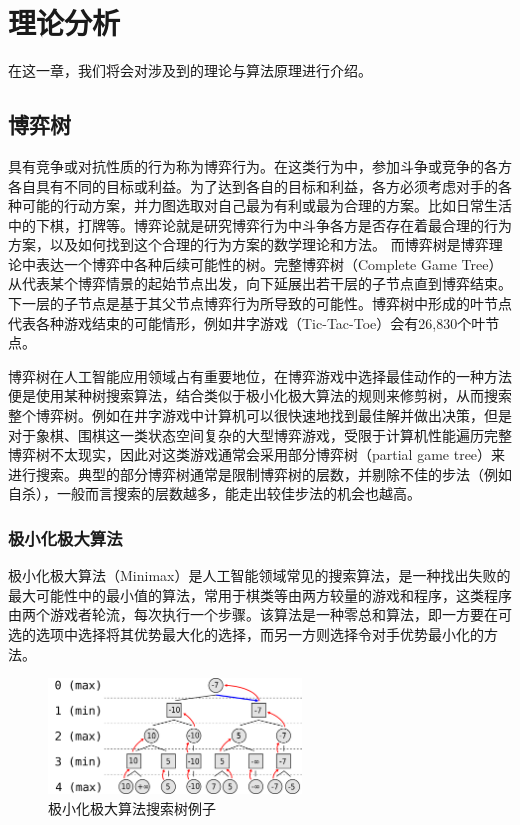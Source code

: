 \chapter{理论分析}
\label{chap:theory}
在这一章，我们将会对涉及到的理论与算法原理进行介绍。
\section{博弈树}
具有竞争或对抗性质的行为称为博弈行为。在这类行为中，参加斗争或竞争的各方各自具有不同的目标或利益。为了达到各自的目标和利益，各方必须考虑对手的各种可能的行动方案，并力图选取对自己最为有利或最为合理的方案。比如日常生活中的下棋，打牌等。博弈论就是研究博弈行为中斗争各方是否存在着最合理的行为方案，以及如何找到这个合理的行为方案的数学理论和方法\cite{gt}。
而博弈树是博弈理论中表达一个博弈中各种后续可能性的树。完整博弈树（Complete Game Tree）从代表某个博弈情景的起始节点出发，向下延展出若干层的子节点直到博弈结束。下一层的子节点是基于其父节点博弈行为所导致的可能性。博弈树中形成的叶节点代表各种游戏结束的可能情形，例如井字游戏（Tic-Tac-Toe）会有26,830个叶节点\cite{NAU1982257,allis1994searching}。


博弈树在人工智能应用领域占有重要地位，在博弈游戏中选择最佳动作的一种方法便是使用某种树搜索算法，结合类似于极小化极大算法的规则来修剪树，从而搜索整个博弈树。例如在井字游戏中计算机可以很快速地找到最佳解并做出决策，但是对于象棋、围棋这一类状态空间复杂的大型博弈游戏，受限于计算机性能遍历完整博弈树不太现实，因此对这类游戏通常会采用部分博弈树（partial game tree）来进行搜索。典型的部分博弈树通常是限制博弈树的层数，并剔除不佳的步法（例如自杀），一般而言搜索的层数越多，能走出较佳步法的机会也越高\cite{coin12162}。

\subsection{极小化极大算法}
极小化极大算法（Minimax）是人工智能领域常见的搜索算法，是一种找出失败的最大可能性中的最小值的算法，常用于棋类等由两方较量的游戏和程序，这类程序由两个游戏者轮流，每次执行一个步骤。该算法是一种零总和算法，即一方要在可选的选项中选择将其优势最大化的选择，而另一方则选择令对手优势最小化的方法\cite{ctt1r2gkx}。

\begin{figure}[htb]
    \centering
    \includegraphics[width=0.6\textwidth]{Minimax.png}
    \caption[minimax]{%
      极小化极大算法搜索树例子\cite{wikiMinimax}%
      }
    \label{fig:minimax}
  \end{figure}

